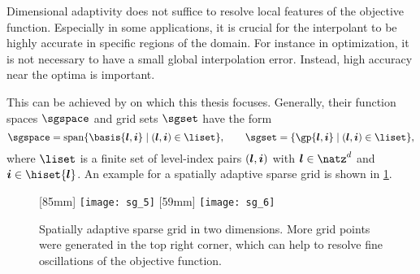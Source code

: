 Dimensional adaptivity does not suffice to resolve local features of the
objective function.
Especially in some applications, it is crucial for the
interpolant to be highly accurate in specific regions of the domain.
For instance in optimization, it is not necessary to have a small global
interpolation error.
Instead, high accuracy near the optima is important.

This can be achieved by 
on which this thesis focuses.
Generally, their function spaces $\sgspace$
and grid sets $\sgset$ have the form
\begin{equation}
  \label{eq:spatiallyAdaptiveSG}
  \sgspace
  = \spn\{\basis{\*l,\*i} \mid (\*l,\*i) \in \liset\},\qquad
  \sgset
  = \{\gp{\*l,\*i} \mid (\*l,\*i) \in \liset\},
\end{equation}
where $\liset$ is a finite set of level-index pairs $({\boldsymbol{l}},{\boldsymbol{i}})$
with $\*l \in \natz^d$ and $\*i \in \hiset{\*l}$.
An example for a spatially adaptive sparse grid is shown in
\cref{fig:spatiallyAdaptiveSG}.

\begin{figure}
  [85mm]{%
    \texttt{[image: sg\_5]}%
  }%
  \hfill%
  [59mm]{%
    \texttt{[image: sg\_6]}%
  }%
  \caption[%
    Construction of spatially adaptive sparse grids%
  ]{%
    Spatially adaptive sparse grid in two dimensions.
    More grid points were generated in the top right corner,
    which can help to resolve fine oscillations of the objective function.%
  }%
  \label{fig:spatiallyAdaptiveSG}%
\end{figure}

